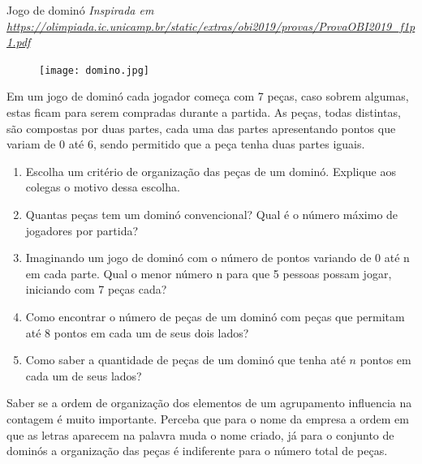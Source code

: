 \begin{task}{Jogo de dominó}
\textit{Inspirada em \url{ https://olimpiada.ic.unicamp.br/static/extras/obi2019/provas/ProvaOBI2019_f1p1.pdf} }

\begin{figure}[H]
\centering

\texttt{[image: domino.jpg]}
\end{figure}


Em um jogo de dominó cada jogador começa com 7 peças, caso sobrem algumas, estas ficam para serem compradas durante a partida. As peças, todas distintas, são compostas por duas partes, cada uma das partes apresentando pontos que variam de 0 até 6, sendo permitido que a peça tenha duas partes iguais.
 
\begin{enumerate}

\item Escolha um critério de organização das peças de um dominó. Explique aos colegas o motivo dessa escolha.

\item Quantas peças tem um dominó convencional? Qual é o número máximo de jogadores por partida?

\item Imaginando um jogo de dominó com o número de pontos variando de 0 até n em cada parte. Qual o menor número n para que 5 pessoas possam jogar, iniciando com 7 peças cada?

\item Como encontrar o número de peças de um dominó com peças que permitam até 8 pontos em cada um de seus dois lados? 

\item Como saber a quantidade de peças de um dominó que tenha até $n$ pontos em cada um de seus lados?

\end{enumerate}

\end{task}

\begin{knowledge}
Saber se a ordem de organização dos elementos de um agrupamento influencia na contagem é muito importante. Perceba que para o nome da empresa a ordem em que as letras aparecem na palavra muda o nome criado, já para o conjunto de dominós a organização das peças é indiferente para o número total de peças. 
\end{knowledge}

